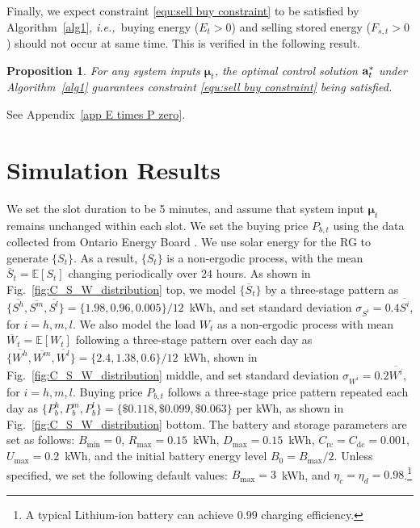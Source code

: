 \documentclass[journal]{IEEEtran}
\def\mubf{\boldsymbol \mu }
\def\abf{{\bf a}}
\def\ie{{\it i.e.,\ \/}}
\newtheorem{proposition}{Proposition}
\begin{document}
Finally, we expect constraint \eqref{equ:sell buy constraint} to be satisfied by Algorithm~\ref{alg1}, \ie buying energy ($E_t>0$) and selling stored energy  ($F_{s,t}>0$) should not occur at same time. This is verified in the following result.
\begin{proposition}\label{prop E times P zero}
For any system inputs $\mubf_t$, the optimal control solution $\abf^*_t$ under Algorithm~\ref{alg1} guarantees constraint \eqref{equ:sell buy constraint} being satisfied.
\end{proposition}
\IEEEproof
See Appendix~\ref{app E times P zero}.
\endIEEEproof

\section{Simulation Results}\label{sec:sim}

We set the slot duration to be 5 minutes, and assume that system input  $\mubf_t$ remains unchanged within each slot. We set the buying price $P_{b,t}$ using the data collected from Ontario Energy Board \cite{website:Ontario_Elec}. We use solar energy for the RG to generate  $\{S_t\}$. As a result,  $\{S_t\}$ is a non-ergodic process, with the mean  $\overline{S}_t=\mathbb{E}[S_t]$ changing periodically over $24$ hours. As shown in Fig.~\ref{fig:C_S_W_distribution} top, we model $\{\overline{S}_t\}$ by  a three-stage pattern as $\{\overline{S^{h}},\overline{S^{m}},\overline{S^{l}}\}=\{1.98,0.96,0.005\}/12$~{kWh,} and set standard deviation $\sigma_{S^i}=0.4\overline{S^i}$, for $i=h,m,l$. We also model the load $W_t$ as a non-ergodic process with mean  $\overline{W}_{t}=\mathbb{E}[W_t]$ following a three-stage  pattern over each day as $\{\overline{W^{h}},\overline{W^{m}},\overline{W^{l}}\}=\{2.4,1.38,0.6\}/12$~{kWh}, shown in Fig.~\ref{fig:C_S_W_distribution} middle, and set standard deviation  $\sigma_{W^i}=0.2\overline{W^i}$, for $i=h,m,l$. Buying price $P_{b,t}$ follows a three-stage price pattern repeated each day as $\{P_{b}^h, P_{b}^m, P_{b}^l\}=\{\$0.118, \$0.099, \$0.063\}$ per kWh, as shown in Fig.~\ref{fig:C_S_W_distribution} bottom. The battery and storage parameters are set as follows: $B_{\min}=0$, $R_{\max}=0.15$~{kWh}, $D_{\max}=0.15$~{kWh}, $C_{\textrm{rc}}=C_{\textrm{dc}}=0.001$, $U_{\max}=0.2$~{kWh},  and the initial battery energy level $B_0={B_{\max}}/{2}$. Unless specified, we set the following default values: $B_{\max}=3$~kWh, and $\eta_c=\eta_d=0.98$.\footnote{A typical Lithium-ion battery can achieve $0.99$ charging efficiency.}
\end{document}
